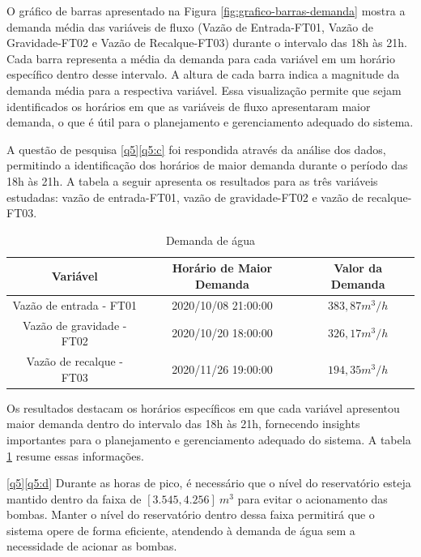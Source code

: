 O gráfico de barras apresentado na Figura \ref{fig:grafico-barras-demanda} mostra a demanda média das variáveis de fluxo (Vazão de Entrada-FT01, Vazão de Gravidade-FT02 e Vazão de Recalque-FT03) durante o intervalo das 18h às 21h. Cada barra representa a média da demanda para cada variável em um horário específico dentro desse intervalo. A altura de cada barra indica a magnitude da demanda média para a respectiva variável. Essa visualização permite que sejam identificados os horários em que as variáveis de fluxo apresentaram maior demanda, o que é útil para o planejamento e gerenciamento adequado do sistema.

A questão de pesquisa \ref{q5}\ref{q5:c} foi respondida através da análise dos dados, permitindo a identificação dos horários de maior demanda durante o período das 18h às 21h. A tabela a seguir apresenta os resultados para as três variáveis estudadas: vazão de entrada-FT01, vazão de gravidade-FT02 e vazão de recalque-FT03.




\begin{table}[!htpb]
	\centering
	\caption{Demanda de água}\label{tb:dem}
	\begin{tabular}{@{}ccc@{}}
		\toprule
		\textbf{Variável}         & \textbf{Horário de Maior Demanda} & \textbf{Valor da Demanda} \\ \midrule
		Vazão de entrada - FT01   & 2020/10/08 21:00:00               & $383,87 m^3/h$                   \\
		Vazão de gravidade - FT02 & 2020/10/20 18:00:00               & $326,17 m^3/h$                    \\
		Vazão de recalque - FT03  & 2020/11/26 19:00:00               & $194,35 m^3/h$                    \\ \bottomrule
	\end{tabular}
	
	
\end{table}

Os resultados destacam os horários específicos em que cada variável apresentou maior demanda dentro do intervalo das 18h às 21h, fornecendo insights importantes para o planejamento e gerenciamento adequado do sistema. A tabela \ref{tb:dem} resume essas informações.


\ref{q5}\ref{q5:d} Durante as horas de pico, é necessário que o nível do reservatório esteja mantido dentro da faixa de $[3.545, 4.256] \ m^3$ para evitar o acionamento das bombas. Manter o nível do reservatório dentro dessa faixa permitirá que o sistema opere de forma eficiente, atendendo à demanda de água sem a necessidade de acionar as bombas.

